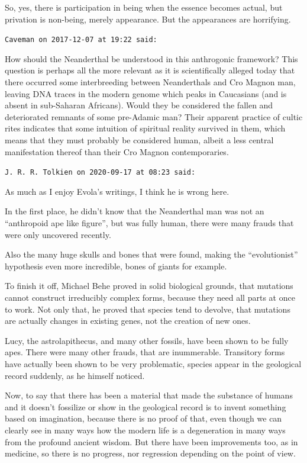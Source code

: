 \begin{footnotesize}
\begin{sffamily}
So, yes, there is participation in being when the essence becomes actual, but privation is non-being, merely appearance. But the appearances are horrifying.

\hfill

\texttt{Caveman on 2017-12-07 at 19:22 said:}

How should the Neanderthal be understood in this anthrogonic framework? This question is perhaps all the more relevant as it is scientifically alleged today that there occurred some interbreeding between Neanderthals and Cro Magnon man, leaving DNA traces in the modern genome which peaks in Caucasians (and is absent in sub-Saharan Africans). Would they be considered the fallen and deteriorated remnants of some pre-Adamic man? Their apparent practice of cultic rites indicates that some intuition of spiritual reality survived in them, which means that they must probably be considered human, albeit a less central manifestation thereof than their Cro Magnon contemporaries.

\hfill

\texttt{J. R. R. Tolkien on 2020-09-17 at 08:23 said:}

As much as I enjoy Evola's writings, I think he is wrong here.

In the first place, he didn't know that the Neanderthal man was not an ``anthropoid ape like figure'', but was fully human, there were many frauds that were only uncovered recently.

Also the many huge skulls and bones that were found, making the ``evolutionist'' hypothesis even more incredible, bones of giants for example.

To finish it off, Michael Behe proved in solid biological grounds, that mutations cannot construct irreducibly complex forms, because they need all parts at once to work. Not only that, he proved that species tend to devolve, that mutations are actually changes in existing genes, not the creation of new ones.

Lucy, the astrolapithecus, and many other fossils, have been shown to be fully apes. There were many other frauds, that are inummerable. Transitory forms have actually been shown to be very problematic, species appear in the geological record suddenly, as he himself noticed.

Now, to say that there has been a material that made the substance of humans and it doesn't fossilize or show in the geological record is to invent something based on imagination, because there is no proof of that, even though we can clearly see in many ways how the modern life is a degeneration in many ways from the profound ancient wisdom. But there have been improvements too, as in medicine, so there is no progress, nor regression depending on the point of view.


\end{sffamily}
\end{footnotesize}
